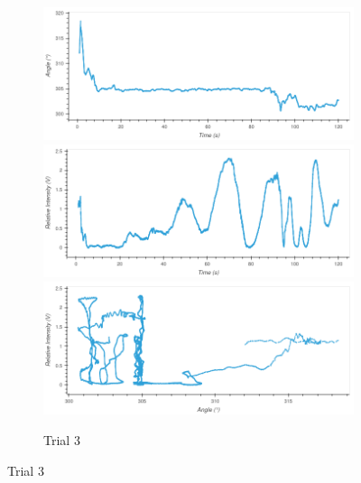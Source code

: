 \begin{figure}
\begin{subfigure}{1.0\textwidth}
\caption*{Trial 3}
\includegraphics[width=\plotwidth]{plots/t3-time-angle.png}
\includegraphics[width=\plotwidth]{plots/t3-time-intensity.png}
\includegraphics[width=\plotwidth]{plots/t3-angle-intensity.png}
\end{subfigure}




\end{figure}

